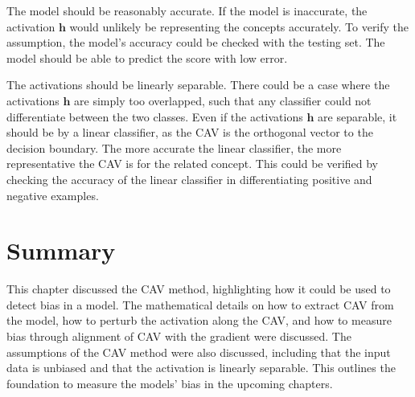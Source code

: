 The model should be reasonably accurate. If the model is inaccurate, the activation $\boldsymbol{h}$ would unlikely be representing the concepts accurately. To verify the assumption, the model's accuracy could be checked with the testing set. The model should be able to predict the score with low error.

The activations should be linearly separable. There could be a case where the activations $\boldsymbol{h}$ are simply too overlapped, such that any classifier could not differentiate between the two classes. Even if the activations $\boldsymbol{h}$ are separable, it should be by a linear classifier, as the CAV is the orthogonal vector to the decision boundary. The more accurate the linear classifier, the more representative the CAV is for the related concept. This could be verified by checking the accuracy of the linear classifier in differentiating positive and negative examples.

\section{Summary}
This chapter discussed the CAV method, highlighting how it could be used to detect bias in a model. The mathematical details on how to extract CAV from the model, how to perturb the activation along the CAV, and how to measure bias through alignment of CAV with the gradient were discussed. The assumptions of the CAV method were also discussed, including that the input data is unbiased and that the activation is linearly separable. This outlines the foundation to measure the models' bias in the upcoming chapters.